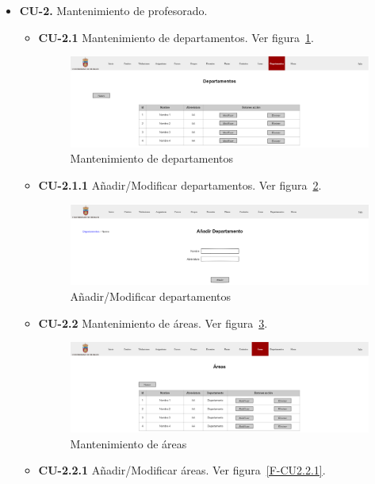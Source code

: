 \begin{itemize}
\newpage	
	\item \textbf{CU-2.} Mantenimiento de profesorado.
	\begin{itemize}
		\item \textbf{CU-2.1} Mantenimiento de departamentos. Ver figura~\ref{F-CU2.1}.
		\begin{figure}[!h]
		\centering
		\includegraphics[width=\textwidth]{../img/Anexos/Vistas/departamentos.png}
		\caption{Mantenimiento de departamentos}\label{F-CU2.1}
		\end{figure}
		\FloatBarrier
		\item \textbf{CU-2.1.1} Añadir/Modificar departamentos. Ver figura~\ref{F-CU2.1.1}.
		\begin{figure}[!h]
		\centering
		\includegraphics[width=\textwidth]{../img/Anexos/Vistas/add_departamento.png}
		\caption{Añadir/Modificar departamentos}\label{F-CU2.1.1}
		\end{figure}
		\FloatBarrier
\newpage
		\item \textbf{CU-2.2} Mantenimiento de áreas. Ver figura~\ref{F-CU2.2}.
		\begin{figure}[!h]
		\centering
		\includegraphics[width=\textwidth]{../img/Anexos/Vistas/areas.png}
		\caption{Mantenimiento de áreas}\label{F-CU2.2}
		\end{figure}
		\FloatBarrier
		\item \textbf{CU-2.2.1} Añadir/Modificar áreas. Ver figura~\ref{F-CU2.2.1}.

\end{itemize}
\end{itemize}
